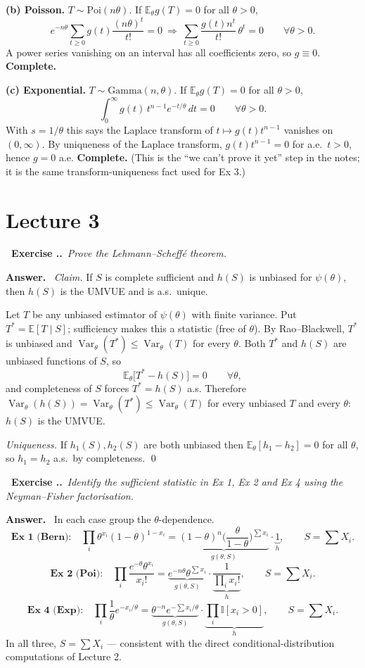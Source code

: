 \documentclass[11pt]{article}
\newcommand{\E}{\mathbb{E}}
\newcommand{\Var}{\operatorname{Var}}
\newcommand{\I}{\mathbb{I}}
\newcounter{exc}[section]
\newenvironment{exc}[1]{\medskip\refstepcounter{exc}%
  \noindent\textbf{\color{ForestGreen}\raisebox{0.5pt}{\scriptsize$\blacksquare$}\ Exercise \thesection.\theexc.}\ \textit{#1}\par\nopagebreak}{\par}
\newcommand{\ans}{\smallskip\noindent\textbf{Answer.}\ }
\begin{document}
\textbf{(b) Poisson.} $T\sim\mathrm{Poi}(n\theta)$. If $\E_\theta g(T)=0$ for all $\theta>0$,
\[
e^{-n\theta}\sum_{t\ge0}g(t)\frac{(n\theta)^{t}}{t!}=0
\ \Longrightarrow\
\sum_{t\ge0}\frac{g(t)n^{t}}{t!}\,\theta^{t}=0\qquad\forall\theta>0 .
\]
A power series vanishing on an interval has all coefficients zero, so $g\equiv0$.
\textbf{Complete.}

\textbf{(c) Exponential.} $T\sim\mathrm{Gamma}(n,\theta)$. If $\E_\theta g(T)=0$ for all
$\theta>0$,
\[
\int_0^\infty g(t)\,t^{n-1}e^{-t/\theta}\,dt=0\qquad\forall\theta>0 .
\]
With $s=1/\theta$ this says the Laplace transform of $t\mapsto g(t)t^{n-1}$ vanishes on
$(0,\infty)$. By uniqueness of the Laplace transform, $g(t)t^{n-1}=0$ for a.e.\ $t>0$, hence
$g=0$ a.e. \textbf{Complete.} (This is the ``we can't prove it yet'' step in the notes; it is
the same transform-uniqueness fact used for Ex 3.)

\section{Lecture 3}

\begin{exc}{Prove the Lehmann--Scheff\'e theorem.}
\end{exc}
\ans
\emph{Claim.} If $S$ is complete sufficient and $h(S)$ is unbiased for $\psi(\theta)$, then
$h(S)$ is the UMVUE and is a.s.\ unique.

Let $T$ be any unbiased estimator of $\psi(\theta)$ with finite variance. Put
$T^*=\E[T\mid S]$; sufficiency makes this a statistic (free of $\theta$). By Rao--Blackwell,
$T^*$ is unbiased and $\Var_\theta(T^*)\le\Var_\theta(T)$ for every $\theta$. Both $T^*$ and
$h(S)$ are unbiased functions of $S$, so
\[
\E_\theta\big[T^*-h(S)\big]=0\qquad\forall\theta ,
\]
and completeness of $S$ forces $T^*=h(S)$ a.s. Therefore
$\Var_\theta(h(S))=\Var_\theta(T^*)\le\Var_\theta(T)$ for every unbiased $T$ and every
$\theta$: $h(S)$ is the UMVUE.

\emph{Uniqueness.} If $h_1(S),h_2(S)$ are both unbiased then $\E_\theta[h_1-h_2]=0$ for all
$\theta$, so $h_1=h_2$ a.s.\ by completeness. \qed

\begin{exc}{Identify the sufficient statistic in Ex 1, Ex 2 and Ex 4 using the
Neyman--Fisher factorisation.}
\end{exc}
\ans
In each case group the $\theta$-dependence.
\[
\textbf{Ex 1 (Bern):}\quad
\prod_i\theta^{x_i}(1-\theta)^{1-x_i}
=\underbrace{(1-\theta)^n\Big(\frac{\theta}{1-\theta}\Big)^{\sum x_i}}_{g(\theta,S)}\cdot
\underbrace{1}_{h},\qquad S=\textstyle\sum X_i .
\]
\[
\textbf{Ex 2 (Poi):}\quad
\prod_i\frac{e^{-\theta}\theta^{x_i}}{x_i!}
=\underbrace{e^{-n\theta}\theta^{\sum x_i}}_{g(\theta,S)}\cdot
\underbrace{\frac{1}{\prod_i x_i!}}_{h},\qquad S=\textstyle\sum X_i .
\]
\[
\textbf{Ex 4 (Exp):}\quad
\prod_i\frac1\theta e^{-x_i/\theta}
=\underbrace{\theta^{-n}e^{-\sum x_i/\theta}}_{g(\theta,S)}\cdot
\underbrace{\prod_i\I[x_i>0]}_{h},\qquad S=\textstyle\sum X_i .
\]
In all three, $S=\sum X_i$ --- consistent with the direct conditional-distribution
computations of Lecture 2.
\end{document}
